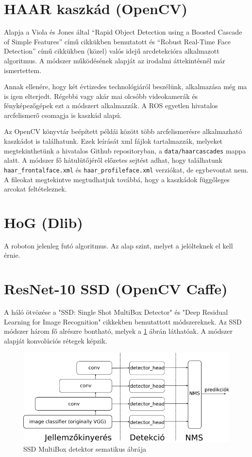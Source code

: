 \section{HAAR kaszkád (OpenCV)}
Alapja a Viola és Jones által “Rapid Object Detection using a Boosted Cascade of Simple Features”\cite{viola_rapid_2001} című cikkükben bemutatott és “Robust Real-Time Face Detection”\cite{viola_robust_2004} című cikkükben (közel) valós idejű arcdetekcióra alkalmazott algoritmus. A módszer működésének alapját az irodalmi áttekintésnél már ismertettem.

Annak ellenére, hogy két évtizedes technológiáról beszélünk, alkalmazása még ma is igen elterjedt. Régebbi vagy akár mai olcsóbb videokamerák és fényképezőgépek ezt a módszert alkalmazzák. A ROS egyetlen hivatalos arcfelismerő csomagja \cite{noauthor_face_detector_nodate} is kaszkád alapú.

Az OpenCV könyvtár beépített példái között több arcfelismerésre alkalmazható kaszkádot is találhatunk. Ezek leírását xml fájlok tartalmazzák, melyeket megtekinthetünk a hivatalos Github repositoryban\cite{noauthor_opencvopencv_2021}, a \lstinline{data/haarcascades} mappa alatt. A módszer fő hátulütőjéről előzetes sejtést adhat, hogy találhatunk \lstinline{haar_frontalface.xml} és \lstinline{haar_profileface.xml} verziókat, de egybevontat nem. A fileokat megtekintve megtudhatjuk továbbá, hogy a kaszkádok függőleges arcokat feltételeznek.

\section{HoG (Dlib)}
A roboton jelenleg futó algoritmus. Az alap szint, melyet a jelölteknek el kell érnie.

\section{ResNet-10 SSD (OpenCV Caffe)}
A háló ötvözése a "SSD: Single Shot MultiBox Detector"\cite{liu_ssd_2016} és "Deep Residual Learning for Image Recognition"\cite{he_deep_2015} cikkekben bemutattott módszereknek. Az SSD módszer három fő alrészre bontható, melyek a
\ref{fig:ssd_multibox_detector}
ábrán láthatóak. A módszer alapját konvolúciós rétegek képzik.

\begin{figure}
    \centering
    \includegraphics[width=\linewidth]{figures/ssd_multibox_detector.png}
    \caption{SSD MultiBox detektor sematikus ábrája}
    \label{fig:ssd_multibox_detector}
\end{figure}

